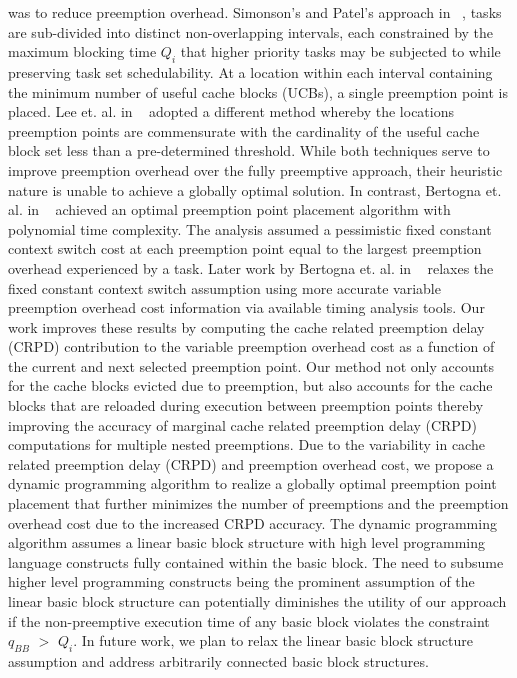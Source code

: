 was to reduce preemption overhead.  Simonson’s and Patel’s approach in ~\cite{simonson:95}, tasks are sub-divided into distinct non-overlapping intervals, each constrained by the maximum blocking time \begin{math}Q_{i}\end{math} that higher priority tasks may be subjected to while preserving task set schedulability.  At a location within each interval containing the minimum number of useful cache blocks (UCBs), a single preemption point is placed.  Lee et. al. in ~\cite{lee:98} adopted a different method whereby the locations preemption points are commensurate with the cardinality of the useful cache block set less than a pre-determined threshold.   While both techniques serve to improve preemption overhead over the fully preemptive approach, their heuristic nature is unable to achieve a globally optimal solution.  In contrast, Bertogna et. al. in ~\cite{bertogna:10} achieved an optimal preemption point placement algorithm with polynomial time complexity.  The analysis assumed a pessimistic fixed constant context switch cost at each preemption point equal to the largest preemption overhead experienced by a task.  Later work by Bertogna et. al. in ~\cite{bertogna:11} relaxes the fixed constant context switch assumption using more accurate variable preemption overhead cost information via available timing analysis tools.  Our work improves these results by computing the cache related preemption delay (CRPD) contribution to the variable preemption overhead cost as a function of the current and next selected preemption point.  Our method not only accounts for the cache blocks evicted due to preemption, but also accounts for the cache blocks that are reloaded during execution between preemption points thereby improving the accuracy of marginal cache related preemption delay (CRPD) computations for multiple nested preemptions.  Due to the variability in cache related preemption delay (CRPD) and preemption overhead cost, we propose a dynamic programming algorithm to realize a globally optimal preemption point placement that further minimizes the number of preemptions and the preemption overhead cost due to the increased CRPD accuracy.  The dynamic programming algorithm assumes a linear basic block structure with high level programming language constructs fully contained within the basic block.  The need to subsume higher level programming constructs being the prominent assumption of the linear basic block structure can potentially diminishes the utility of our approach if the non-preemptive execution time of any basic block violates the constraint \begin{math}q_{BB}\end{math} \begin{math}>\end{math} \begin{math}Q_{i}\end{math}. In future work, we plan to relax the linear basic block structure assumption and address arbitrarily connected basic block structures.

